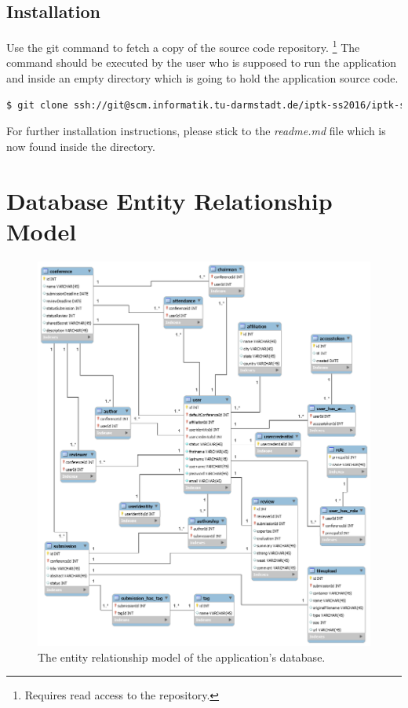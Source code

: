 \documentclass[nochapterpage,nopartpage,noheadingspace,numbersubsubsec,bigchapter,colorback,accentcolor=tud9c,10pt]{tudreport}
\begin{document}
  \section{Installation}
  \label{sec:appendix:setup:install}

    \noindent Use the git command to fetch a copy of the source code repository.%
    \footnote{Requires read access to the repository.}
    The command should be executed by the user who is supposed to run the application and inside an empty directory which is going to hold the application source code.
        \begin{lstlisting}[language=bash]
    $ git clone ssh://git@scm.informatik.tu-darmstadt.de/iptk-ss2016/iptk-ss2016-team-whiskey.git .
        \end{lstlisting}
    For further installation instructions, please stick to the \emph{readme.md} file which is now found inside the directory.

    \pagebreak

  \chapter{Database Entity Relationship Model}
  \label{ch:appendix:erm}

        \begin{figure}[!ht]
            \centering
            \includegraphics[width=\textwidth]{img/er-diagram}
            \caption{The entity relationship model of the application's database.}
            \label{fig:appendix:erm:er-diagram}
        \end{figure}
\end{document}
